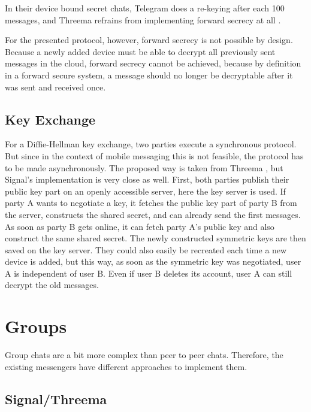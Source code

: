 \documentclass[a4paper, oneside]{discothesis}
\begin{document}
In their device bound secret chats, Telegram does a re-keying after each 100 messages, and Threema refrains from implementing forward secrecy at all \cite{Threema}.

For the presented protocol, however, forward secrecy is not possible by design. Because a newly added device must be able to decrypt all previously sent messages in the cloud, forward secrecy cannot be achieved, because by definition in a forward secure system, a message should no longer be decryptable after it was sent and received once.

\subsection{Key Exchange}

For a Diffie-Hellman key exchange, two parties execute a synchronous protocol. But since in the context of mobile messaging this is not feasible, the protocol has to be made asynchronously. The proposed way is taken from Threema \cite{Threema}, but Signal's implementation is very close as well. First, both parties publish their public key part on an openly accessible server, here the key server is used. If party A wants to negotiate a key, it fetches the public key part of party B from the server, constructs the shared secret, and can already send the first messages. As soon as party B gets online, it can fetch party A's public key and also construct the same shared secret. The newly constructed symmetric keys are then saved on the key server. They could also easily be recreated each time a new device is added, but this way, as soon as the symmetric key was negotiated, user A is independent of user B. Even if user B deletes its account, user A can still decrypt the old messages.

\section{Groups}

Group chats are a bit more complex than peer to peer chats. Therefore, the existing messengers have different approaches to implement them.

\subsection{Signal/Threema}
\end{document}

